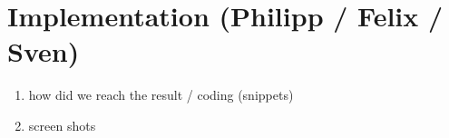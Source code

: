 \section{Implementation (Philipp / Felix / Sven)}
\begin{enumerate}
    \item how did we reach the result / coding (snippets)
    \item screen shots
\end{enumerate}
